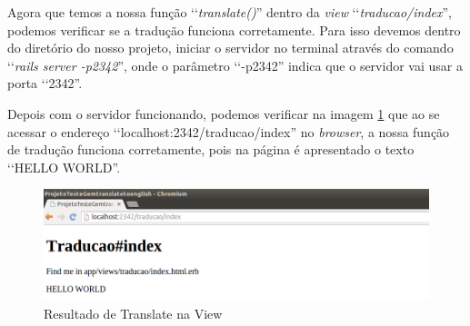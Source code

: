 Agora que temos a nossa função ‘‘\emph{translate()}'' dentro da \emph{view} ‘‘\emph{traducao/index}'', podemos
verificar se a tradução funciona corretamente. Para isso devemos dentro do diretório do nosso projeto,
iniciar o servidor no terminal através do comando ‘‘\emph{rails server -p2342}'', onde o parâmetro ‘‘-p2342''
indica que o servidor vai usar a porta ‘‘2342''.

Depois com o servidor funcionando, podemos verificar na imagem \ref{fig:resultado_de_translate_na_view}
que ao se acessar o endereço ‘‘localhost:2342/traducao/index'' no \emph{browser}, a nossa função de
tradução funciona corretamente, pois na página é apresentado o texto ‘‘HELLO WORLD''.

 \begin{figure}[ht]
  \includegraphics[scale=0.49]{images/resultado_de_translate_na_view.png}
  \caption{Resultado de Translate na View}
  \label{fig:resultado_de_translate_na_view}
\end{figure}
